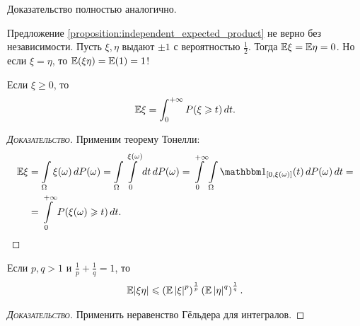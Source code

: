 \documentclass[../main.tex]{subfiles}
\begin{document}
Доказательство полностью аналогично.

\begin{remrk}
 Предложение \ref{proposition:independent_expected_product} не верно без независимости. Пусть $ \xi, \eta $ выдают $ \pm 1 $ с вероятностью $ \frac{1}{2} $. Тогда $ \mathbb E\xi = \mathbb E\eta = 0 $. Но если $ \xi = \eta $, то $ \mathbb E(\xi\eta) = \mathbb E(1) = 1 $!
\end{remrk}

\begin{prop}
 Если $ \xi \geqslant 0 $, то
 \begin{align*}
  \mathbb E\xi = \int_{0}^{+\infty} P(\xi \geqslant t)\,dt.
 \end{align*} 
\end{prop}
\begin{proof}[\normalfont\textsc{Доказательство}]
 Применим теорему Тонелли:
 \begin{align*}
  \E\xi &= \int\limits_{\Omega} \xi(\omega)\,dP(\omega) = \int\limits_{\Omega} \int\limits_{0}^{\xi(\omega)} dt\,dP(\omega) = \int\limits_{0}^{+\infty} \int\limits_{\Omega}   \Ind_{[0, \xi(\omega)]}(t)\,dP(\omega)\,dt = \\
  &= \int\limits_{0}^{+\infty} P(\xi(\omega) \geqslant t)\,dt.
 \end{align*} 
\end{proof}

\begin{prop}
	\label{proposition:gulder_inequality}
 Если $ p, q > 1 $ и $ \frac{1}{p}+\frac{1}{q} = 1 $, то
 \begin{align*}
  \mathbb E|\xi\eta| \leqslant \left( \mathbb E \left| \xi \right|^{p} \right)^{\frac{1}{p}} \left( \mathbb E \left| \eta \right|^{q} \right)^{\frac{1}{q}}.
 \end{align*} 
\end{prop}
\begin{proof}[\normalfont\textsc{Доказательство}]
 Применить неравенство Гёльдера для интегралов.
\end{proof}
\end{document}
